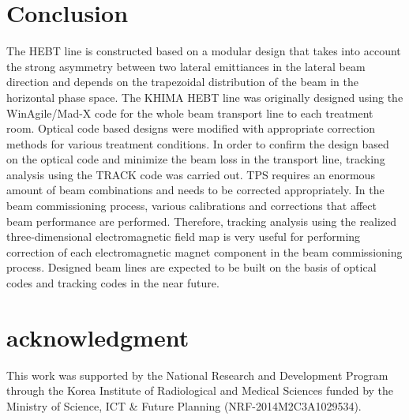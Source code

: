 \documentclass[jkps,preprint,fleqn,showpacs,showkeys,10pt,twocolumn]{revtex4}
\begin{document}
\section{Conclusion}
\label{sec:Con}
The HEBT line is constructed based on a modular design that takes into account the strong asymmetry
between two lateral emittiances in the lateral beam direction and depends on the trapezoidal distribution of the beam in the horizontal phase space.
The KHIMA HEBT line was originally designed using the WinAgile/Mad-X code for the whole beam transport line to each treatment room.
Optical code based designs were modified with appropriate correction methods for various treatment conditions. 
In order to confirm the design based on the optical code and minimize the beam loss in the transport line, tracking analysis using the TRACK code was carried out.
TPS requires an enormous amount of beam combinations and needs to be corrected appropriately.
In the beam commissioning process, various calibrations and corrections that affect beam performance are performed.
Therefore, tracking analysis using the realized three-dimensional electromagnetic field map is very useful
for performing correction of each electromagnetic magnet component in the beam commissioning process.
Designed beam lines are expected to be built on the basis of optical codes and tracking codes in the near future.
\section{acknowledgment}
This work was supported by the National Research and Development Program through the Korea Institute of Radiological and Medical Sciences
funded by the Ministry of Science, ICT \& Future Planning (NRF-2014M2C3A1029534).
\end{document}
